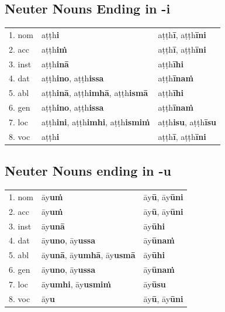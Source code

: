 \documentclass[11pt,oneside]{memoir}
\begin{document}
\subsection{Neuter Nouns Ending in -i}
\label{sec:org1a5b6ac}

\begin{center}
\begin{tabular}{lll}
1. nom & aṭṭh\textbf{i} & aṭṭh\textbf{ī}, aṭṭh\textbf{īni}\\[0pt]
2. acc & aṭṭh\textbf{iṁ} & aṭṭh\textbf{ī}, aṭṭh\textbf{īni}\\[0pt]
3. inst & aṭṭh\textbf{inā} & aṭṭh\textbf{īhi}\\[0pt]
4. dat & aṭṭh\textbf{ino}, aṭṭh\textbf{issa} & aṭṭh\textbf{īnaṁ}\\[0pt]
5. abl & aṭṭh\textbf{inā}, aṭṭh\textbf{imhā}, aṭṭh\textbf{ismā} & aṭṭh\textbf{īhi}\\[0pt]
6. gen & aṭṭh\textbf{ino}, aṭṭh\textbf{issa} & aṭṭh\textbf{īnaṁ}\\[0pt]
7. loc & aṭṭh\textbf{ini}, aṭṭh\textbf{imhi}, aṭṭh\textbf{ismiṁ} & aṭṭh\textbf{isu}, aṭṭh\textbf{īsu}\\[0pt]
8. voc & aṭṭh\textbf{i} & aṭṭh\textbf{ī}, aṭṭh\textbf{īni}\\[0pt]
\end{tabular}
\end{center}

\subsection{Neuter Nouns ending in -u}
\label{sec:org6989cd1}

\begin{center}
\begin{tabular}{lll}
1. nom & āy\textbf{uṁ} & āy\textbf{ū}, āy\textbf{ūni}\\[0pt]
2. acc & āy\textbf{uṁ} & āy\textbf{ū}, āy\textbf{ūni}\\[0pt]
3. inst & āy\textbf{unā} & āy\textbf{ūhi}\\[0pt]
4. dat & āy\textbf{uno}, āy\textbf{ussa} & āy\textbf{ūnaṁ}\\[0pt]
5. abl & āy\textbf{unā}, āy\textbf{umhā}, āy\textbf{usmā} & āy\textbf{ūhi}\\[0pt]
6. gen & āy\textbf{uno}, āy\textbf{ussa} & āy\textbf{ūnaṁ}\\[0pt]
7. loc & āy\textbf{umhi}, āy\textbf{usmiṁ} & āy\textbf{ūsu}\\[0pt]
8. voc & āy\textbf{u} & āy\textbf{ū}, āy\textbf{ūni}\\[0pt]
\end{tabular}
\end{center}
\end{document}
